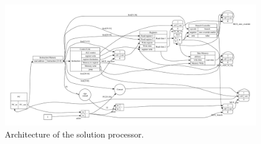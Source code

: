 \begin{figure}[h!]
	\begin{center}
		\includegraphics[keepaspectratio, angle=90, height=\textheight, width=\textwidth]{graphics/cpu-architecture/cpu-architecture.pdf}
		\caption{Architecture of the solution processor.}
		\label{figure:cpu-architecture}
	\end{center}
\end{figure}